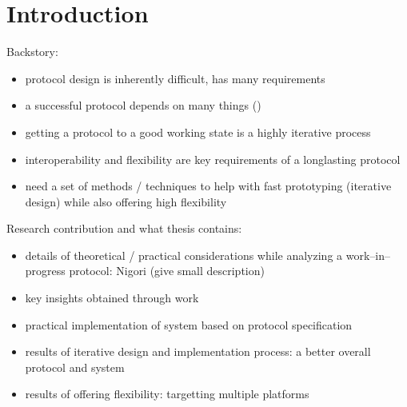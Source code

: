 \chapter{Introduction}
\setcounter{page}{1}

Backstory:
\begin{itemize}
  \item protocol design is inherently difficult, has many requirements \cite{ProtocolDesign}
  \item a successful protocol depends on many things (\cite{RFC5218})
  \item getting a protocol to a good working state is a highly iterative process
  \item interoperability and flexibility are key requirements of a longlasting protocol
  \item need a set of methods / techniques to help with fast prototyping (iterative design) while also offering high flexibility
\end{itemize}

Research contribution and what thesis contains:
\begin{itemize}
  \item details of theoretical / practical considerations while analyzing a work--in--progress protocol: Nigori (give small description)
  \item key insights obtained through work
  \item practical implementation of system based on protocol specification
  \item results of iterative design and implementation process: a better overall protocol and system
  \item results of offering flexibility: targetting multiple platforms
\end{itemize}
